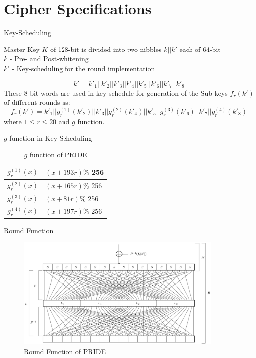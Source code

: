 \section{Cipher Specifications}
\begin{frame}{Key-Scheduling}
    \begin{block}{}
        Master Key $K$ of 128-bit is divided into two nibbles $k||k'$ each of 64-bit\\
        $k$ - Pre- and Post-whitening\\
        $k'$ - Key-scheduling for the round implementation
    \end{block}
    \begin{block}{}
        $$ k' = k'_{1}||k'_{2}||k'_{3}||k'_{4}||k'_{5}||k'_{6}||k'_{7}||k'_{8} $$
        These 8-bit words are used in key-schedule for generation of the Sub-keys $ f_r(k') $ of different rounds as:
		$$ f_r(k') = k'_{1}||g_r^{(1)}(k'_{2})||k'_{3}||g_r^{(2)}(k'_{4})||k'_{5}||g_r^{(3)}(k'_{6})||k'_{7}||g_r^{(4)}(k'_{8})
		 $$
		where $ 1 \le r \le 20 $ and $ g $ function.
    \end{block}
\end{frame}

\begin{frame}{$g$ function in Key-Scheduling}
    \begin{block}{}
        \begin{table}[H]
			\centering
			\begin{tabular}{|c|l|}
				\hline
				$ g_r^{(1)}(x) $ &  $ (x + 193r) \% $ 256 \\ \hline
				$ g_r^{(2)}(x) $ &  $ (x + 165r) \% $ 256 \\ \hline
				$ g_r^{(3)}(x) $ &  $ (x + 81r) \% $ 256 \\ \hline
				$ g_r^{(4)}(x) $ &  $ (x + 197r) \% $ 256 \\ \hline
			\end{tabular}
			\caption{$g$ function of PRIDE}
			\label{g}
		\end{table}
    \end{block}
\end{frame}

\begin{frame}{Round Function}
    \begin{figure}
        \centering
        \includegraphics[width=10cm]{pride}
        \caption{Round Function of PRIDE}
        \label{fig:2}
    \end{figure}
\end{frame}

